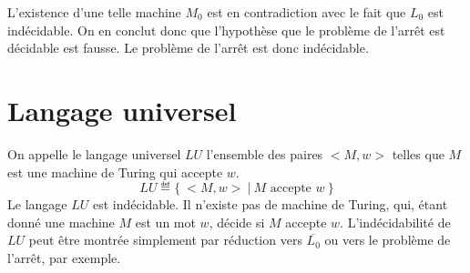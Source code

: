 L'existence d'une telle machine $M_0$ est en contradiction avec le fait que $L_0$ est indécidable.
On en conclut donc que l'hypothèse que le problème de l'arrêt est décidable est fausse.
Le problème de l'arrêt est donc indécidable.

\section{Langage universel}

On appelle le langage universel $LU$ l'ensemble des paires $<M, w>$ telles que $M$ est une machine de Turing qui accepte $w$.
\[
LU \eqdef \{\ <M, w>\ |\ M \text{ accepte } w\ \}
\]
Le langage $LU$ est indécidable.
Il n'existe pas de machine de Turing, qui, étant donné une machine $M$ est un mot $w$, décide si $M$ accepte $w$.
L'indécidabilité de $LU$ peut être montrée simplement par réduction vers $\overline{L_0}$ ou vers le problème de l'arrêt, par exemple. 